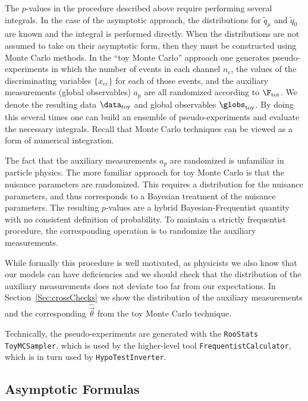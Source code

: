 The $p$-values in the procedure described above require performing several integrals.  In the case of the asymptotic approach, the distributions for $\tilde q_\mu$ and $\tilde q_0$ are known and the integral is performed directly.  When the distributions are not assumed to take on their asymptotic form, then they must be constructed using Monte Carlo methods.  In the ``toy Monte Carlo'' approach one generates pseudo-experiments in which the number of events in each channel $n_c$, the values of the discriminating variables $\{x_{ec}\}$ for each of those events, and the auxiliary measurements (global observables) $a_p$ are all randomized according to $\F_{\rm tot}$.    We  denote the resulting data $\data_{\rm toy}$ and global observables $\globs_{\rm toy}$.  By doing this several times one can build an ensemble of pseudo-experiments and evaluate the necessary integrals.  Recall that Monte Carlo techniques can be viewed as a form of numerical integration.


The fact that the auxiliary measurements $a_p$ are randomized is unfamiliar in particle physics.  The more familiar approach for toy Monte Carlo is that the nuisance parameters are randomized.  This requires a distribution for the nuisance parameters, and thus corresponds to a Bayesian treatment of the nuisance parameters.  The resulting $p$-values are a hybrid Bayesian-Frequentist quantity with no consistent definition of probability.  To maintain a strictly frequentist procedure, the corresponding operation is to randomize the auxiliary measurements.  


While formally this procedure is well motivated, as physicists we also know that our models can have deficiencies and we should check that the distribution of the auxiliary measurements does not deviate too far from our expectations.  In Section~\ref{Sec:crossChecks} we show the distribution of the auxiliary measurements and the corresponding $\hat{\vec\theta}$ from the toy Monte Carlo technique.  


Technically, the pseudo-experiments are generated with the \texttt{RooStats} \texttt{ToyMCSampler}, which is used by the higher-level tool \texttt{FrequentistCalculator}, which is in turn used by \texttt{HypoTestInverter}.


\subsection{Asymptotic Formulas }


